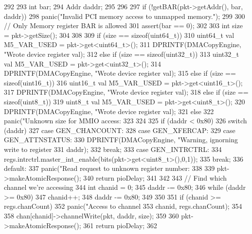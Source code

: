 \begin{DoxyCode}
292 {
293     int bar;
294     Addr daddr;
295 
296 
297     if (!getBAR(pkt->getAddr(), bar, daddr))
298         panic("Invalid PCI memory access to unmapped memory.\n");
299 
300     // Only Memory register BAR is allowed
301     assert(bar == 0);
302 
303     int size = pkt->getSize();
304 
308 
309     if (size == sizeof(uint64_t)) {
310         uint64_t val M5_VAR_USED = pkt->get<uint64_t>();
311         DPRINTF(DMACopyEngine, "Wrote device register %
      val);
312     } else if (size == sizeof(uint32_t)) {
313         uint32_t val M5_VAR_USED = pkt->get<uint32_t>();
314         DPRINTF(DMACopyEngine, "Wrote device register %
      val);
315     } else if (size == sizeof(uint16_t)) {
316         uint16_t val M5_VAR_USED = pkt->get<uint16_t>();
317         DPRINTF(DMACopyEngine, "Wrote device register %
      val);
318     } else if (size == sizeof(uint8_t)) {
319         uint8_t val M5_VAR_USED = pkt->get<uint8_t>();
320         DPRINTF(DMACopyEngine, "Wrote device register %
      val);
321     } else {
322         panic("Unknown size for MMIO access: %
323     }
324 
325     if (daddr < 0x80) {
326         switch (daddr) {
327           case GEN_CHANCOUNT:
328           case GEN_XFERCAP:
329           case GEN_ATTNSTATUS:
330             DPRINTF(DMACopyEngine, "Warning, ignorning write to register %
331                     daddr);
332             break;
333           case GEN_INTRCTRL:
334             regs.intrctrl.master_int_enable(bits(pkt->get<uint8_t>(),0,1));
335             break;
336           default:
337             panic("Read request to unknown register number: %
338         }
339         pkt->makeAtomicResponse();
340         return pioDelay;
341     }
342 
343     // Find which channel we're accessing
344     int chanid = 0;
345     daddr -= 0x80;
346     while (daddr >= 0x80) {
347         chanid++;
348         daddr -= 0x80;
349     }
350 
351     if (chanid >= regs.chanCount)
352         panic("Access to channel %
353                 chanid, regs.chanCount);
354 
358     chan[chanid]->channelWrite(pkt, daddr, size);
359 
360     pkt->makeAtomicResponse();
361     return pioDelay;
362 }
\end{DoxyCode}


